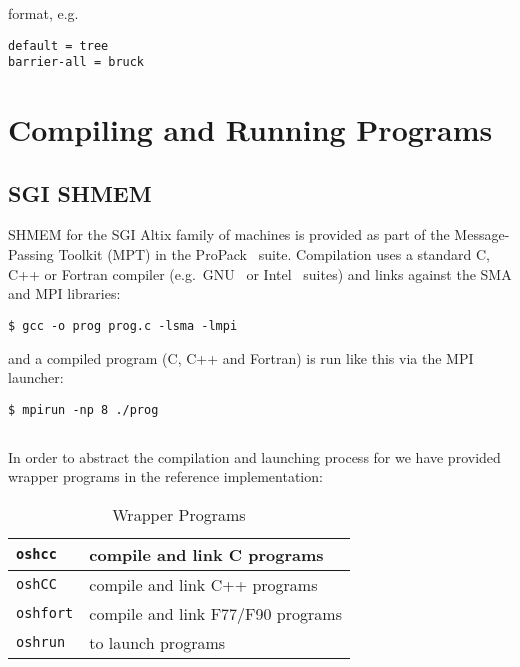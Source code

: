 format, e.g.\

\begin{minipage}{\linewidth}
\begin{lstlisting}[caption={Configuration File Example}]
default = tree
barrier-all = bruck
\end{lstlisting}
\end{minipage}

\section{Compiling and Running Programs}

\subsection{SGI SHMEM}

SHMEM for the SGI Altix family of machines is provided as part of the
Message-Passing Toolkit (MPT) in the ProPack~\cite{ProPack}
suite. Compilation uses a standard C, C++ or Fortran compiler
(e.g.\ GNU~\cite{gcc} or Intel~\cite{intelcomp} suites) and links
against the SMA and MPI libraries:

\begin{lstlisting}[caption={Compiling and Linking SGI SHMEM}]
$ gcc -o prog prog.c -lsma -lmpi
\end{lstlisting}

and a compiled program (C, C++ and Fortran) is run like this via the
MPI launcher:

\begin{lstlisting}[label=oshrun,caption={Running a program on 8 processors with the SGI SHMEM Implementation}]
$ mpirun -np 8 ./prog
\end{lstlisting}

\subsection{\openshmem}

In order to abstract the compilation and launching process for
\openshmem we have provided wrapper programs in the reference
implementation:

\begin{table}[h]
  \begin{center}
    \caption{Wrapper Programs}
    \begin{tabular}{| l | l |}
      \hline
      \texttt{oshcc} & compile and link C programs \tabularnewline
      \hline
      \texttt{oshCC} & compile and link C++ programs \tabularnewline
      \hline
      \texttt{oshfort} & compile and link F77/F90 programs \tabularnewline
      \hline
      \texttt{oshrun} & to launch programs \tabularnewline
      \hline
    \end{tabular}
  \end{center}
\end{table}

